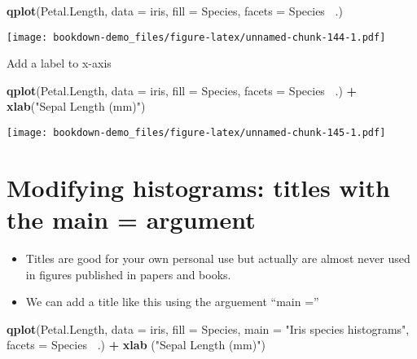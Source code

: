\documentclass[]{book}
\newenvironment{Shaded}{\begin{snugshade}}{\end{snugshade}}
\newcommand{\KeywordTok}[1]{\textcolor[rgb]{0.13,0.29,0.53}{\textbf{#1}}}
\newcommand{\DataTypeTok}[1]{\textcolor[rgb]{0.13,0.29,0.53}{#1}}
\newcommand{\StringTok}[1]{\textcolor[rgb]{0.31,0.60,0.02}{#1}}
\newcommand{\OperatorTok}[1]{\textcolor[rgb]{0.81,0.36,0.00}{\textbf{#1}}}
\newcommand{\NormalTok}[1]{#1}
\providecommand{\tightlist}{%
  \setlength{\itemsep}{0pt}\setlength{\parskip}{0pt}}
\theoremstyle{definition}
\theoremstyle{definition}
\theoremstyle{definition}
\theoremstyle{remark}
\begin{document}
\begin{Shaded}
\begin{Highlighting}[]
\KeywordTok{qplot}\NormalTok{(Petal.Length,}
      \DataTypeTok{data =}\NormalTok{ iris,}
      \DataTypeTok{fill =}\NormalTok{ Species,}
      \DataTypeTok{facets =}\NormalTok{ Species }\OperatorTok{~}\NormalTok{.) }
\end{Highlighting}
\end{Shaded}

\texttt{[image: bookdown-demo\_files/figure-latex/unnamed-chunk-144-1.pdf]}

Add a label to x-axis

\begin{Shaded}
\begin{Highlighting}[]
\KeywordTok{qplot}\NormalTok{(Petal.Length,}
      \DataTypeTok{data =}\NormalTok{ iris,}
      \DataTypeTok{fill =}\NormalTok{ Species,}
      \DataTypeTok{facets =}\NormalTok{ Species }\OperatorTok{~}\NormalTok{.) }\OperatorTok{+}\StringTok{  }
\StringTok{  }\KeywordTok{xlab}\NormalTok{(}\StringTok{"Sepal Length (mm)"}\NormalTok{)}
\end{Highlighting}
\end{Shaded}

\texttt{[image: bookdown-demo\_files/figure-latex/unnamed-chunk-145-1.pdf]}

\section{Modifying histograms: titles with the main =
argument}\label{modifying-histograms-titles-with-the-main-argument}

\begin{itemize}
\tightlist
\item
  Titles are good for your own personal use but actually are almost
  never used in figures published in papers and books.
\item
  We can add a title like this using the arguement ``main =''
\end{itemize}

\begin{Shaded}
\begin{Highlighting}[]
\KeywordTok{qplot}\NormalTok{(Petal.Length,}
      \DataTypeTok{data =}\NormalTok{ iris,}
      \DataTypeTok{fill =}\NormalTok{ Species,}
      \DataTypeTok{main =} \StringTok{"Iris species histograms"}\NormalTok{,}
      \DataTypeTok{facets =}\NormalTok{ Species }\OperatorTok{~}\NormalTok{.) }\OperatorTok{+}\StringTok{  }
\StringTok{  }\KeywordTok{xlab}\NormalTok{ (}\StringTok{"Sepal Length (mm)"}\NormalTok{)}
\end{Highlighting}
\end{Shaded}
\end{document}
